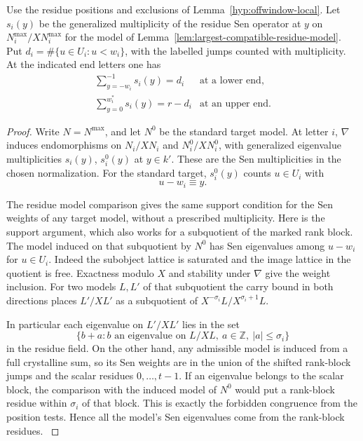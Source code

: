 \begin{auxlemma}\label{lem:end-sen-multiplicities}
Use the residue positions and exclusions of Lemma~\ref{hyp:offwindow-local}.
Let \(s_i(y)\) be the generalized multiplicity of the residue Sen
operator at \(y\) on \(N_i^{\max}/XN_i^{\max}\) for the model of
Lemma~\ref{lem:largest-compatible-residue-model}.
Put \(d_i=\#\{u\in U_i:u<w_i\}\), with the labelled jumps counted
with multiplicity. At the indicated end letters one has
\[
 \begin{array}{ll}
 \displaystyle\sum_{y=-w_i}^{-1}s_i(y)=d_i &\text{at a lower end},\\[4pt]
 \displaystyle\sum_{y=0}^{w_i^*}s_i(y)=r-d_i &\text{at an upper end}.
 \end{array}
\]
\end{auxlemma}
\begin{proof}
Write \(N=N^{\max}\), and let \(N^0\) be the standard target
model. At letter \(i\), \(\nabla\) induces endomorphisms on
\(N_i/XN_i\) and \(N_i^0/XN_i^0\), with generalized
eigenvalue multiplicities \(s_i(y)\), \(s_i^0(y)\) at
\(y\in k'\). These are the Sen multiplicities in the
chosen normalization. For the standard target,
\(s_i^0(y)\) counts \(u\in U_i\) with
\[
 u-w_i\equiv y.
\]

The residue model comparison gives the same support condition
for the Sen weights of any target model, without a prescribed
multiplicity. Here is the support argument, which also works
for a subquotient of the marked rank block. The model induced on
that subquotient by \(N^0\) has Sen eigenvalues among \(u-w_i\)
for \(u\in U_i\). Indeed the subobject lattice is saturated and
the image lattice in the quotient is free. Exactness modulo \(X\)
and stability under \(\nabla\) give the weight inclusion.
For two models \(L,L'\) of that subquotient the carry bound
in both directions places \(L'/XL'\) as a subquotient of
\(X^{-\sigma_i}L/X^{\sigma_i+1}L\).

In particular each eigenvalue on \(L'/XL'\) lies in the set
\[
 \{b+a:b\text{ an eigenvalue on }L/XL,\ a\in\mathbb Z,\ |a|\le\sigma_i\}
\]
in the residue field.
On the other hand, any admissible model is induced from a
full crystalline sum, so its Sen weights are in the union of
the shifted rank-block jumps and the scalar residues
\(0,\ldots,t-1\). If an eigenvalue belongs to the scalar
block, the comparison with the induced model of \(N^0\)
would put a rank-block residue within \(\sigma_i\) of
that block. This is exactly the forbidden congruence from
the position tests. Hence all the model's Sen eigenvalues
come from the rank-block residues.
\label{cor:residue-model-length-3}


\end{proof}
